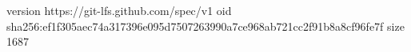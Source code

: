version https://git-lfs.github.com/spec/v1
oid sha256:ef1f305aec74a317396e095d7507263990a7ce968ab721cc2f91b8a8cf96fe7f
size 1687
